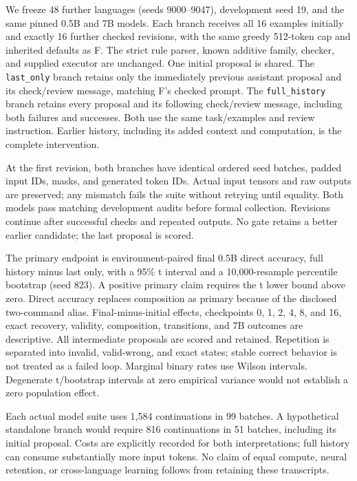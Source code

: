 \documentclass[11pt]{article}
\begin{document}
We freeze 48 further languages (seeds 9000--9047), development seed 19,
and the same pinned 0.5B and 7B models. Each branch receives all 16 examples
initially and exactly 16 further checked revisions, with the same greedy
512-token cap and inherited defaults as F. The strict rule parser, known
additive family, checker, and supplied executor are unchanged. One initial
proposal is shared. The \texttt{last\_only} branch retains only the immediately
previous assistant proposal and its check/review message, matching F's checked
prompt. The \texttt{full\_history} branch retains every proposal and its
following check/review message, including both failures and successes. Both
use the same task/examples and review instruction. Earlier history, including
its added context and computation, is the complete intervention.

At the first revision, both branches have identical ordered seed batches,
padded input IDs, masks, and generated token IDs. Actual input tensors and
raw outputs are preserved; any mismatch fails the suite without retrying
until equality. Both models pass matching development audits before formal
collection. Revisions continue after successful checks and repeated outputs.
No gate retains a better earlier candidate; the last proposal is scored.

The primary endpoint is environment-paired final 0.5B direct accuracy,
full history minus last only, with a 95\% t interval and a 10,000-resample
percentile bootstrap (seed 823). A positive primary claim requires the t
lower bound above zero. Direct accuracy replaces composition as primary
because of the disclosed two-command alias. Final-minus-initial effects,
checkpoints 0, 1, 2, 4, 8, and 16, exact recovery, validity, composition,
transitions, and 7B outcomes are descriptive. All intermediate proposals
are scored and retained. Repetition is separated into invalid, valid-wrong,
and exact states; stable correct behavior is not treated as a failed loop.
Marginal binary rates use Wilson intervals. Degenerate t/bootstrap intervals
at zero empirical variance would not establish a zero population effect.

Each actual model suite uses 1,584 continuations in 99 batches. A hypothetical
standalone branch would require 816 continuations in 51 batches, including its
initial proposal. Costs are explicitly recorded for both interpretations;
full history can consume substantially more input tokens. No claim of equal
compute, neural retention, or cross-language learning follows from retaining
these transcripts.
\end{document}
